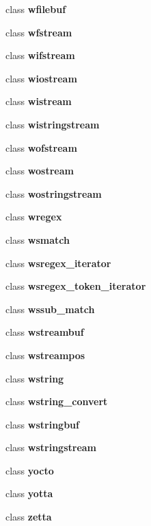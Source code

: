 \begin{DoxyCompactItemize}
\item 
class {\bf wfilebuf}
\item 
class {\bf wfstream}
\item 
class {\bf wifstream}
\item 
class {\bf wiostream}
\item 
class {\bf wistream}
\item 
class {\bf wistringstream}
\item 
class {\bf wofstream}
\item 
class {\bf wostream}
\item 
class {\bf wostringstream}
\item 
class {\bf wregex}
\item 
class {\bf wsmatch}
\item 
class {\bf wsregex\+\_\+iterator}
\item 
class {\bf wsregex\+\_\+token\+\_\+iterator}
\item 
class {\bf wssub\+\_\+match}
\item 
class {\bf wstreambuf}
\item 
class {\bf wstreampos}
\item 
class {\bf wstring}
\item 
class {\bf wstring\+\_\+convert}
\item 
class {\bf wstringbuf}
\item 
class {\bf wstringstream}
\item 
class {\bf yocto}
\item 
class {\bf yotta}
\item 
class {\bf zetta}
\end{DoxyCompactItemize}
